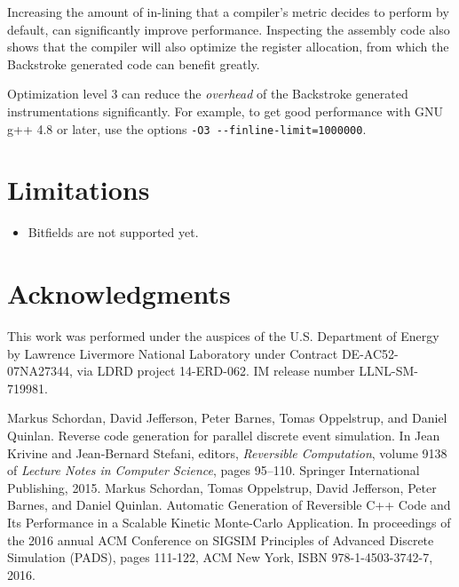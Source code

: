 \documentclass[english,12pt, titlepage]{article}      %
\begin{document}
Increasing the amount of in-lining that a compiler's metric decides to
perform by default, can significantly improve performance.  Inspecting
the assembly code also shows that the compiler will also optimize the
register allocation, from which the Backstroke generated code can
benefit greatly.

Optimization level 3 can reduce the {\em overhead} of
the Backstroke generated instrumentations significantly. For example,
to get good performance with GNU g++ 4.8 or later, use the options \verb+-O3 --finline-limit=1000000+.

\section{Limitations}

\begin{itemize}
\item Bitfields are not supported yet.
\end{itemize}

\section{Acknowledgments}

This work was performed under the auspices of the U.S. Department of
Energy by Lawrence Livermore National Laboratory under Contract
DE-AC52-07NA27344, via LDRD project 14-ERD-062. IM release number
LLNL-SM-719981.

\begin{thebibliography}{1}

Markus Schordan, David Jefferson, Peter Barnes, Tomas Oppelstrup, and Daniel
  Quinlan.
\newblock Reverse code generation for parallel discrete event simulation.
\newblock In Jean Krivine and Jean-Bernard Stefani, editors, {\em Reversible
  Computation}, volume 9138 of {\em Lecture Notes in Computer Science}, pages
  95--110. Springer International Publishing, 2015.
Markus Schordan, Tomas Oppelstrup, David Jefferson, Peter Barnes, and Daniel
  Quinlan.
\newblock Automatic Generation of Reversible C++ Code and Its Performance in a Scalable Kinetic Monte-Carlo Application.
\newblock In proceedings of the 2016 annual ACM Conference on SIGSIM Principles of Advanced Discrete Simulation (PADS), pages 111-122, ACM New York, ISBN 978-1-4503-3742-7, 2016.
\end{thebibliography}

%
% 
\end{document}
